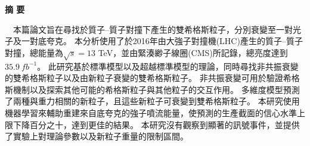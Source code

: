 
\begin{CJK}{UTF8}{bkai}

\checktoopen
\thispagestyle{plain}
\begin{center}
{\Huge \bfseries 摘 要 \par}
\end{center}
\bigskip
\bigskip
\bigskip
\bigskip
{\Large 

　本篇論文旨在尋找於質子–質子對撞下產生的雙希格斯粒子，分別衰變至一對光子及一對底夸克。
本分析使用了於2016年由大強子對撞機(LHC)產生的質子–質子對撞，總能量為$\sqrt{s}=13$ TeV，並由緊湊緲子線圈(CMS)所記錄，總亮度達到$35.9~fb^{-1}$。
此研究基於標準模型以及超越標準模型的理論，同時尋找非共振衰變的雙希格斯粒子以及由新粒子衰變的雙希格斯粒子。
非共振衰變可用於驗證希格斯機制以及探索其他可能的希格斯粒子與其他粒子的交互作用。
多維度模型預測了兩種與重力相關的新粒子，且這些新粒子可衰變到雙希格斯粒子。
本研究使用機器學習來輔助重建來自底夸克的強子噴流能量，使預測的生產截面的信心水準上限下降百分之十，達到更佳的結果。
本研究沒有觀察到顯著的訊號事件，並提供了實驗上對理論參數以及新粒子重量的限制區間。

\par}


\end{CJK}


